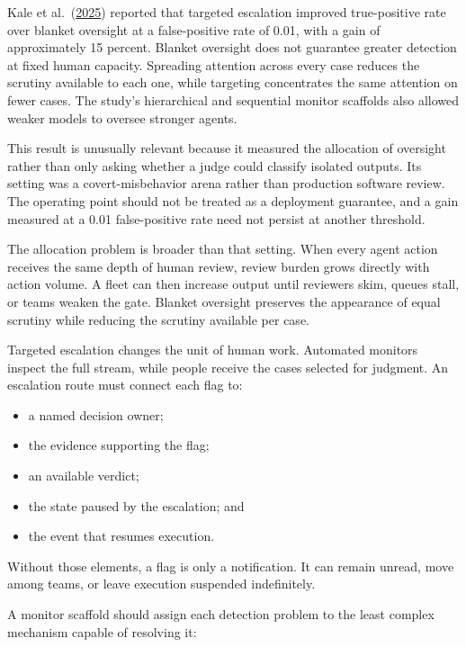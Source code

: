 Kale et al.~(\href{https://arxiv.org/abs/2508.19461}{2025}) reported that targeted escalation improved true-positive rate over blanket oversight at a false-positive rate of 0.01, with a gain of approximately 15 percent. Blanket oversight does not guarantee greater detection at fixed human capacity. Spreading attention across every case reduces the scrutiny available to each one, while targeting concentrates the same attention on fewer cases. The study's hierarchical and sequential monitor scaffolds also allowed weaker models to oversee stronger agents.

This result is unusually relevant because it measured the allocation of oversight rather than only asking whether a judge could classify isolated outputs. Its setting was a covert-misbehavior arena rather than production software review. The operating point should not be treated as a deployment guarantee, and a gain measured at a 0.01 false-positive rate need not persist at another threshold.

The allocation problem is broader than that setting. When every agent action receives the same depth of human review, review burden grows directly with action volume. A fleet can then increase output until reviewers skim, queues stall, or teams weaken the gate. Blanket oversight preserves the appearance of equal scrutiny while reducing the scrutiny available per case.


Targeted escalation changes the unit of human work. Automated monitors inspect the full stream, while people receive the cases selected for judgment. An escalation route must connect each flag to:

\begin{itemize}
\tightlist
\item
  a named decision owner;
\item
  the evidence supporting the flag;
\item
  an available verdict;
\item
  the state paused by the escalation; and
\item
  the event that resumes execution.
\end{itemize}

Without those elements, a flag is only a notification. It can remain unread, move among teams, or leave execution suspended indefinitely.


A monitor scaffold should assign each detection problem to the least complex mechanism capable of resolving it:

